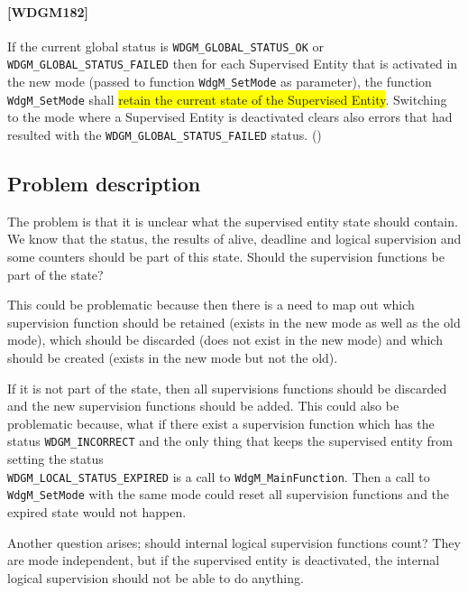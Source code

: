 \paragraph{[WDGM182]} If the current global status is
\lstinline!WDGM_GLOBAL_STATUS_OK! or
\lstinline!WDGM_GLOBAL_STATUS_FAILED! then for each Supervised Entity
that is activated in the new mode (passed to function
\lstinline!WdgM_SetMode! as parameter), the function
\lstinline!WdgM_SetMode! shall \colorbox{yellow}{retain the current
state of the Supervised Entity}.  Switching to the mode where a
Supervised Entity is deactivated clears also errors that had resulted
with the \lstinline!WDGM_GLOBAL_STATUS_FAILED!  status. ()

\subsection{Problem description}
The problem is that it is unclear what the supervised entity state
should contain. We know that the status, the results of alive,
deadline and logical supervision and some counters should be part of
this state. Should the supervision functions be part of the state?

This could be problematic because then there is a need to map out
which supervision function should be retained (exists in the new mode
as well as the old mode), which should be discarded (does not exist in
the new mode) and which should be created (exists in the new mode but
not the old).

If it is not part of the state, then all supervisions functions should
be discarded and the new supervision functions should be added.  This
could also be problematic because, what if there exist a supervision
function which has the status \lstinline!WDGM_INCORRECT!  and the only
thing that keeps the supervised entity from setting the status\\
\lstinline!WDGM_LOCAL_STATUS_EXPIRED! is a call to
\lstinline!WdgM_MainFunction!. Then a call to \lstinline!WdgM_SetMode!
with the same mode could reset all supervision functions and the
expired state would not happen.

Another question arises; should internal logical supervision functions
count? They are mode independent, but if the supervised entity is
deactivated, the internal logical supervision should not be able to do
anything.

